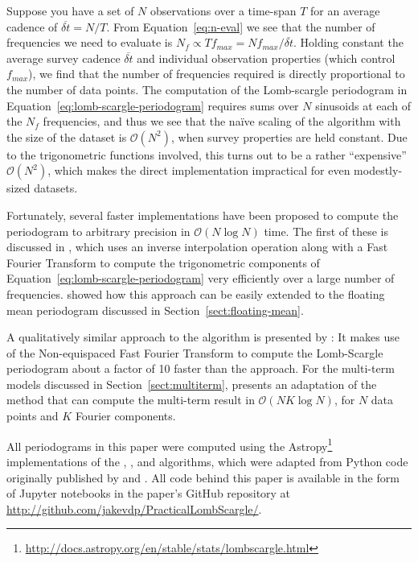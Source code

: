 \documentclass[preprint]{aastex}
\newcommand{\Eq}[1]{Equation~\ref{eq:#1}}
\newcommand{\eq}[1]{\Eq{#1}}
\newcommand{\Sect}[1]{Section~\ref{sect:#1}}
\newcommand{\sect}[1]{\Sect{#1}}
\begin{document}
Suppose you have a set of $N$ observations over a time-span $T$ for an average
cadence of $\overline{\delta t} = N/T$.
From \eq{n-eval} we see that the number of frequencies we need to evaluate is
$N_f \propto T f_{max} = N f_{max} / \overline{\delta t}$.
Holding constant the average survey cadence $\overline{\delta t}$ and individual
observation properties (which control $f_{max}$), we find that the number of
frequencies required is directly proportional to the number of data points.
The computation of the Lomb-scargle periodogram in \eq{lomb-scargle-periodogram}
requires sums over $N$ sinusoids at each of the
$N_f$ frequencies, and thus we see that the
na{\"i}ve scaling of the algorithm with the size of the dataset is
$\mathcal{O}(N^2)$, when survey properties are held constant.
Due to the trigonometric functions involved, this turns out to be a rather
``expensive'' $\mathcal{O}(N^2)$, which makes the direct
implementation impractical for even modestly-sized datasets.

Fortunately, several faster implementations have been proposed to compute the
periodogram to arbitrary precision in $\mathcal{O}(N\log N)$ time.
The first of these is discussed in \citet{Press89}, which uses an inverse
interpolation operation along with a Fast Fourier Transform to compute the
trigonometric components of \eq{lomb-scargle-periodogram} very efficiently over
a large number of frequencies.
\citet{Zechmeister09} showed how this approach can be easily extended to
the floating mean periodogram discussed in \sect{floating-mean}.

A qualitatively similar approach to the \citet{Press89} algorithm
is presented by \citet{Leroy2012}:
It makes use of the Non-equispaced Fast Fourier Transform
\citep[NFFT, see][]{Keiner2009} to compute the Lomb-Scargle periodogram about
a factor of 10 faster than the \citet{Press89} approach.
For the multi-term models discussed in \sect{multiterm}, \citet{Palmer09}
presents an adaptation of the \citet{Press89} method that can compute the
multi-term result in $\mathcal{O}(NK\log N)$, for $N$ data points and
$K$ Fourier components.

All periodograms in this paper were computed using the
Astropy\footnote{\url{http://docs.astropy.org/en/stable/stats/lombscargle.html}}
implementations of the \citet{Press89}, \citet{Zechmeister09}, and
\citet{Palmer09} algorithms, which were adapted from Python code originally
published by \citet{ICVG2014} and \citet{VanderPlas2015}.
All code behind this paper is available in the form of Jupyter notebooks in the
paper's GitHub repository at \url{http://github.com/jakevdp/PracticalLombScargle/}.
\end{document}
